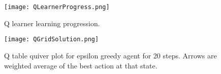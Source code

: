 


\begin{figure}[h]
\texttt{[image: QLearnerProgress.png]}
\caption{Q learner learning progression.}
\label{fig:QLearnerProgress}
\end{figure}


\begin{figure}[h]
\texttt{[image: QGridSolution.png]}
\caption{Q table quiver plot for epsilon greedy agent for 20 steps.  Arrows are weighted average of the best action at that state.}
\label{fig:QGridSolution}
\end{figure}